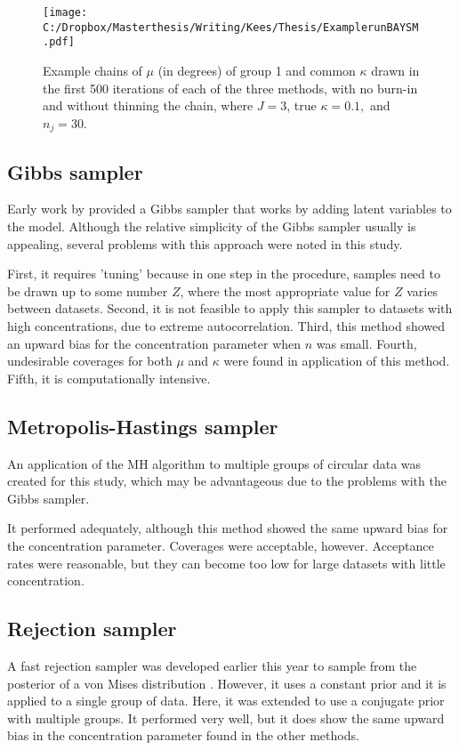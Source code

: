 \documentclass[11pt,a4paper]{article}
\begin{document}
\begin{figure}[bt]
\centering
\texttt{[image: C:/Dropbox/Masterthesis/Writing/Kees/Thesis/ExamplerunBAYSM.pdf]}
\caption{Example chains of $\mu$ (in degrees) of group 1 and common $\kappa$ drawn in the first 500 iterations of each of the three methods, with no burn-in and without thinning the chain, where $J = 3$, true $\kappa = 0.1,$ and $n_j = 30$.}
\label{example}
\end{figure}

\subsection{Gibbs sampler}

Early work by \cite{damien1999fullbayes} provided a Gibbs sampler that works by adding latent variables to the model. Although the relative simplicity of the Gibbs sampler usually is appealing, several problems with this approach were noted in this study. 

First, it requires 'tuning' because in one step in the procedure, samples need to be drawn up to some  number $Z$, where the most appropriate value for $Z$ varies between datasets. Second, it is not feasible to apply this sampler to datasets with high concentrations, due to extreme autocorrelation. Third, this method showed an upward bias for the concentration parameter when $n$ was small. Fourth, undesirable coverages for both $\mu$ and $\kappa$ were found in application of this method. Fifth, it is computationally intensive. 

\subsection{Metropolis-Hastings sampler}

An application of the MH algorithm  to multiple groups of circular data was created for this study, which may be advantageous due to the problems with the Gibbs sampler. 

It performed adequately, although this method showed the same upward bias for the concentration parameter. Coverages were acceptable, however. Acceptance rates were reasonable, but they can become too low for large datasets with little concentration. 

\subsection{Rejection sampler}

A fast rejection sampler was developed earlier this year to sample from the posterior of a von Mises distribution \cite{Mardia}. However, it uses a constant prior and it is applied to a single group of data. Here, it was extended to use a conjugate prior with multiple groups. It performed very well, but it does show the same upward bias in the concentration parameter found in the other methods.
\end{document}
